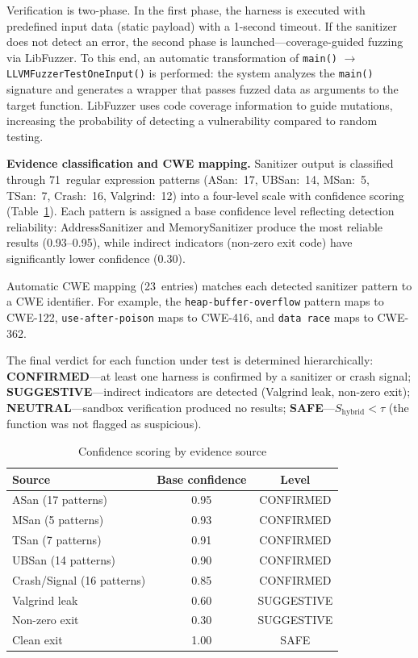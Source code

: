 \documentclass[runningheads]{llncs}
\begin{document}
Verification is two-phase. In the first phase, the harness is executed with predefined input data (static payload) with a 1-second timeout. If the sanitizer does not detect an error, the second phase is launched---coverage-guided fuzzing via LibFuzzer. To this end, an automatic transformation of \texttt{main()} $\to$ \texttt{LLVMFuzzerTestOneInput()} is performed: the system analyzes the \texttt{main()} signature and generates a wrapper that passes fuzzed data as arguments to the target function. LibFuzzer uses code coverage information to guide mutations, increasing the probability of detecting a vulnerability compared to random testing.

\textbf{Evidence classification and CWE mapping.} Sanitizer output is classified through 71~regular expression patterns (ASan:~17, UBSan:~14, MSan:~5, TSan:~7, Crash:~16, Valgrind:~12) into a four-level scale with confidence scoring (Table~\ref{tab:confidence}). Each pattern is assigned a base confidence level reflecting detection reliability: AddressSanitizer and MemorySanitizer produce the most reliable results (0.93--0.95), while indirect indicators (non-zero exit code) have significantly lower confidence (0.30).

Automatic CWE mapping (23~entries) matches each detected sanitizer pattern to a CWE identifier. For example, the \texttt{heap-buffer-overflow} pattern maps to CWE-122, \texttt{use-after-poison} maps to CWE-416, and \texttt{data race} maps to CWE-362.

The final verdict for each function under test is determined hierarchically: \textbf{CONFIRMED}---at least one harness is confirmed by a sanitizer or crash signal; \textbf{SUGGESTIVE}---indirect indicators are detected (Valgrind leak, non-zero exit); \textbf{NEUTRAL}---sandbox verification produced no results; \textbf{SAFE}---$S_{\text{hybrid}} < \tau$ (the function was not flagged as suspicious).

\begin{table}
\centering
\caption{Confidence scoring by evidence source}
\label{tab:confidence}
\small
\begin{tabular}{|l|c|c|}
\hline
\textbf{Source} & \textbf{Base confidence} & \textbf{Level} \\
\hline
ASan (17 patterns) & 0.95 & CONFIRMED \\
MSan (5 patterns) & 0.93 & CONFIRMED \\
TSan (7 patterns) & 0.91 & CONFIRMED \\
UBSan (14 patterns) & 0.90 & CONFIRMED \\
Crash/Signal (16 patterns) & 0.85 & CONFIRMED \\
Valgrind leak & 0.60 & SUGGESTIVE \\
Non-zero exit & 0.30 & SUGGESTIVE \\
Clean exit & 1.00 & SAFE \\
\hline
\end{tabular}
\end{table}
\end{document}
